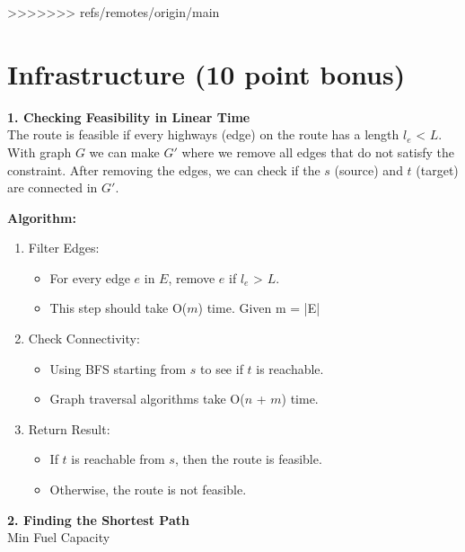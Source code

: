 \documentclass{article}[12pt]
\begin{document}
\begin{algorithm}[H]
{\begin{algorithm}[H]
{  

   \;
>>>>>>> refs/remotes/origin/main
}
\end{algorithm}

\newpage
\section{Infrastructure (10 point bonus)}
\begin{algorithm}[H]
  \textbf{1. Checking Feasibility in Linear Time}\\
  The route is feasible if every highways (edge) on the route has a length $l_e$ < $L$. 
  With graph $G$ we can make $G'$ where we remove all edges that do not satisfy the constraint.
  After removing the edges, we can check if the $s$ (source) and $t$ (target) are connected in $G'$.

  \textbf{Algorithm:}
  \begin{enumerate}
    \item Filter Edges:
      \begin{itemize}
        \item For every edge $e$ in $E$, remove $e$ if $l_e$ > $L$.
        \item This step should take O($m$) time. Given m = |E|
      \end{itemize}
    \item Check Connectivity:
      \begin{itemize}
        \item Using BFS starting from $s$ to see if $t$ is reachable.
        \item Graph traversal algorithms take O($n$ + $m$) time.
      \end{itemize}
    \item Return Result:
      \begin{itemize}
        \item If $t$ is reachable from $s$, then the route is feasible.
        \item Otherwise, the route is not feasible.
      \end{itemize}
  \end{enumerate}

  \textbf{2. Finding the Shortest Path}\\


\caption{Min Fuel Capacity}


\end{algorithm}}
\end{algorithm}
\end{document}
